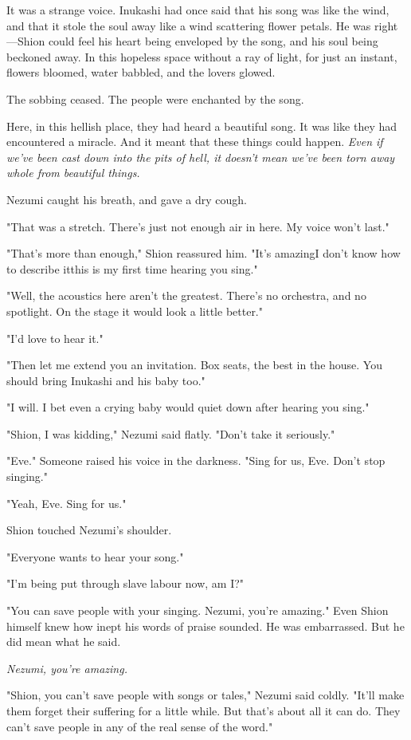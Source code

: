 It was a strange voice. Inukashi had once said that his song was like
the wind, and that it stole the soul away like a wind scattering flower
petals. He was right---Shion could feel his heart being enveloped by the
song, and his soul being beckoned away. In this hopeless space without a
ray of light, for just an instant, flowers bloomed, water babbled, and
the lovers glowed.

The sobbing ceased. The people were enchanted by the song.

Here, in this hellish place, they had heard a beautiful song. It was
like they had encountered a miracle. And it meant that these things
could happen. \emph{Even if we've been cast down into the pits of hell, it
doesn't mean we've been torn away whole from beautiful things.}

Nezumi caught his breath, and gave a dry cough.

"That was a stretch. There's just not enough air in here. My voice won't
last."

"That's more than enough," Shion reassured him. "It's amazing\el I don't
know how to describe it\el this is my first time hearing you sing."

"Well, the acoustics here aren't the greatest. There's no orchestra, and
no spotlight. On the stage it would look a little better."

"I'd love to hear it."

"Then let me extend you an invitation. Box seats, the best in the house.
You should bring Inukashi and his baby too."

"I will. I bet even a crying baby would quiet down after hearing you
sing."

"Shion, I was kidding," Nezumi said flatly. "Don't take it seriously."

"Eve." Someone raised his voice in the darkness. "Sing for us, Eve.
Don't stop singing."

"Yeah, Eve. Sing for us."

Shion touched Nezumi's shoulder.

"Everyone wants to hear your song."

"I'm being put through slave labour now, am I?"

"You can save people with your singing. Nezumi, you're amazing." Even
Shion himself knew how inept his words of praise sounded. He was
embarrassed. But he did mean what he said.

\emph{Nezumi, you're amazing.}

"Shion, you can't save people with songs or tales," Nezumi said coldly.
"It'll make them forget their suffering for a little while. But that's
about all it can do. They can't save people in any of the real sense of
the word."

